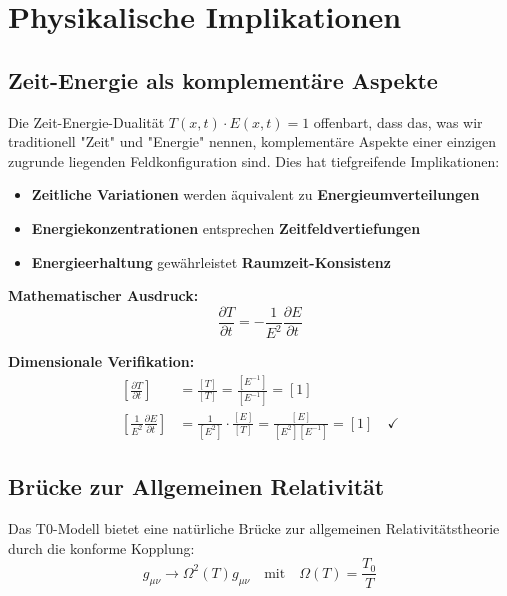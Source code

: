 \documentclass[12pt,a4paper]{report}
\begin{document}
	\section{Physikalische Implikationen}\label{sec:physical_implications}
	
	\subsection{Zeit-Energie als komplementäre Aspekte}\label{subsec:complementary_aspects}
	
	Die Zeit-Energie-Dualität $T(x,t) \cdot E(x,t) = 1$ offenbart, dass das, was wir traditionell "Zeit" und "Energie" nennen, komplementäre Aspekte einer einzigen zugrunde liegenden Feldkonfiguration sind. Dies hat tiefgreifende Implikationen:
	
	\begin{itemize}
		\item \textbf{Zeitliche Variationen} werden äquivalent zu \textbf{Energieumverteilungen}
		\item \textbf{Energiekonzentrationen} entsprechen \textbf{Zeitfeldvertiefungen}
		\item \textbf{Energieerhaltung} gewährleistet \textbf{Raumzeit-Konsistenz}
	\end{itemize}
	
	\textbf{Mathematischer Ausdruck:}
	\begin{equation}
		\frac{\partial T}{\partial t} = -\frac{1}{E^2}\frac{\partial E}{\partial t}
	\end{equation}
	
	\textbf{Dimensionale Verifikation:}
	\begin{align}
		\left[\frac{\partial T}{\partial t}\right] &= \frac{[T]}{[T]} = \frac{[E^{-1}]}{[E^{-1}]} = [1] \\
		\left[\frac{1}{E^2}\frac{\partial E}{\partial t}\right] &= \frac{1}{[E^2]} \cdot \frac{[E]}{[T]} = \frac{[E]}{[E^2][E^{-1}]} = [1] \quad \checkmark
	\end{align}
	
	\subsection{Brücke zur Allgemeinen Relativität}\label{subsec:bridge_general_relativity}
	
	Das T0-Modell bietet eine natürliche Brücke zur allgemeinen Relativitätstheorie durch die konforme Kopplung:
	\begin{equation}
		g_{\mu\nu} \to \Omega^2(T) g_{\mu\nu} \quad \text{mit} \quad \Omega(T) = \frac{T_0}{T}
		\label{eq:conformal_coupling}
	\end{equation}
	
\end{document}
